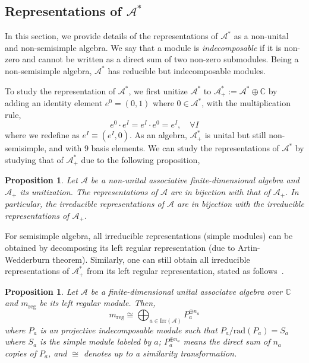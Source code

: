 \documentclass[prx, twocolumn, superscriptaddress, dvipsnames]{revtex4-2}
\newtheorem{prop}[thm]{Proposition}
\theoremstyle{definition}
\newcommand{\mA}{\mathcal{A}}
\begin{document}
\subsection{Representations of $\mA^*$}

In this section, we provide details of the representations of $\mA^*$ as a non-unital and non-semisimple algebra. We say that a module is \textit{indecomposable} if it is non-zero and cannot be written as a direct sum of two non-zero submodules. Being a non-semisimple algebra, $\mA^*$ has reducible but indecomposable modules. 

To study the representation of $\mA^*$, we first unitize $\mA^*$ to $\mA^*_+:=\mA^*\oplus\mathbb{C}$ by adding an identity element $e^0=(0,1)$ where $0\in\mA^*$, with the multiplication rule,
\begin{equation}
    e^0\cdot e^I = e^I \cdot e^0 = e^I,\quad\forall I
\end{equation}
where we redefine as $e^I\equiv(e^I,0)$. 
As an algebra, $\mA^*_+$ is unital but still non-semisimple, and with 9 basis elements. We can study the representations of $\mA^*$ by studying that of $\mA^*_+$ due to the following proposition,

\begin{prop}
    Let $\mA$ be a non-unital associative finite-dimensional algebra and $\mA_+$ its unitization. The representations of $\mA$ are in bijection with that of $\mA_+$. In particular, the irreducible representations of $\mA$ are in bijection with the irreducible representations of $\mA_+$.
\end{prop}

For semisimple algebra, all irreducible representations (simple modules) can be obtained by decomposing its left regular representation (due to Artin-Wedderburn theorem). Similarly, one can still obtain all irreducible representations of $\mA^*_+$ from its left regular representation, stated as follows~\cite{assem2006elements}.

\begin{prop}
Let $\mA$ be a finite-dimensional unital associatve algebra over $\mathbb{C}$ and $m_{\mathrm{reg}}$ be its left regular module. Then,
\begin{equation}
m_{\mathrm{reg}}\cong\bigoplus_{a\in \mathrm{Irr}(\mA)} P_a^{\oplus n_a}
\end{equation}
where $P_a$ is an projective indecomposable module such that $P_a/\mathrm{rad}(P_a)=S_a$ where $S_a$ is the simple module labeled by $a$; $P_a^{\oplus n_a}$ means the direct sum of $n_a$ copies of $P_a$, and $\cong$ denotes up to a similarity transformation.
\end{prop}
\end{document}
